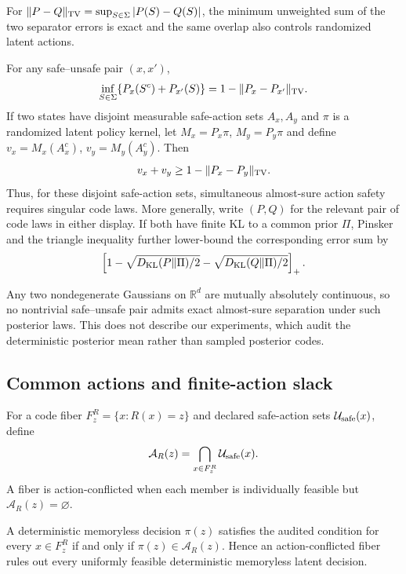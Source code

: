 For $\|P-Q\|_{\rm TV}=\sup_{S\in\Sigma}|P(S)-Q(S)|$, the minimum unweighted sum of the two
separator errors is exact and the same overlap also controls randomized latent actions.
\begin{proposition}
\label{prop:stochastic-tv}
For any safe--unsafe pair $(x,x')$,
\[
 \inf_{S\in\Sigma}\{P_x(S^c)+P_{x'}(S)\}
 =1-\|P_x-P_{x'}\|_{\rm TV}.
\]
If two states have disjoint measurable safe-action sets $A_x,A_y$ and $\pi$ is a randomized latent
policy kernel, let $M_x=P_x\pi$, $M_y=P_y\pi$ and define
$v_x=M_x(A_x^c)$, $v_y=M_y(A_y^c)$.  Then
\[
 v_x+v_y\geq1-\|P_x-P_y\|_{\rm TV}.
\]
Thus, for these disjoint safe-action sets, simultaneous almost-sure action safety requires singular
code laws.  More generally, write $(P,Q)$ for the relevant pair of code laws in either display.
If both have finite KL to a common prior
$\Pi$, Pinsker and the triangle inequality further lower-bound the corresponding error sum by
\[
 \left[1-\sqrt{D_{\rm KL}(P\|\Pi)/2}
          -\sqrt{D_{\rm KL}(Q\|\Pi)/2}\right]_+.
\]
\end{proposition}

Any two nondegenerate Gaussians on $\mathbb R^d$ are mutually absolutely continuous, so no
nontrivial safe--unsafe pair admits exact almost-sure separation under such posterior laws.  This
does not describe our experiments, which audit the deterministic posterior mean rather than
sampled posterior codes.

\subsection{Common actions and finite-action slack}

For a code fiber $F_z^R=\{x:R(x)=z\}$ and declared safe-action sets $\mathcal{U}_{\mathrm{safe}}(x)$, define
\[
 \mathcal A_R(z)=\bigcap_{x\in F_z^R}\mathcal{U}_{\mathrm{safe}}(x).
\]
A fiber is action-conflicted when each member is individually feasible but
$\mathcal A_R(z)=\varnothing$.

\begin{theorem}\label{thm:det-action}
A deterministic memoryless decision $\pi(z)$ satisfies the audited condition for every
$x\in F_z^R$ if and only if $\pi(z)\in\mathcal A_R(z)$.  Hence an action-conflicted fiber rules out
every uniformly feasible deterministic memoryless latent decision.
\end{theorem}


